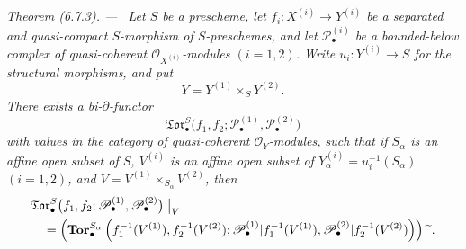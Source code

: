 \documentclass[10pt,oneside]{book}
\newcommand{\sh}[1]{\mathscr{#1}}
\newcommand{\supertilde}{{\,\widetilde{\,}\,}}
\newcommand{\oldpage}[2][]{\setcounter{footnote}{0}\marginpar{\scriptsize\textbf{#1}~|~#2}\ignorespaces}
\newenvironment{theorem}[1][]{\par\medskip\noindent\itshape Theorem (#1). ---\ }{\par}
\begin{document}
\begin{theorem}[6.7.3]
\label{III.6.7.3}
Let $S$ be a prescheme, let
$f_i:X^{(i)}\to Y^{(i)}$ be a separated and quasi-compact
$S$-morphism of $S$-preschemes, and let
$\sh P_\bullet^{(i)}$ be a bounded-below complex of
quasi-coherent $\sh O_{X^{(i)}}$-modules $(i=1,2)$.  Write
$u_i:Y^{(i)}\to S$ for the structural morphisms, and put
\[
  Y=Y^{(1)}\times_SY^{(2)}.
\]
There exists a bi-$\partial$-functor
\[
  \mathfrak{Tor}_\bullet^S
  \bigl(
    f_1,f_2;
    \sh P_\bullet^{(1)},\sh P_\bullet^{(2)}
  \bigr)
\]
with values in the category of quasi-coherent
$\sh O_Y$-modules, such that if $S_\alpha$ is an affine open
subset of $S$, $V^{(i)}$ is an affine open subset of
$Y_\alpha^{(i)}=u_i^{-1}(S_\alpha)$ $(i=1,2)$, and
$V=V^{(1)}\times_{S_\alpha}V^{(2)}$, then
\[
\begin{split}
  &\mathfrak{Tor}_\bullet^S
  \bigl(
    f_1,f_2;
    \sh P_\bullet^{(1)},\sh P_\bullet^{(2)}
  \bigr)\bigm|_V\\
  &\quad=
  \left(
    \mathbf{Tor}_\bullet^{S_\alpha}
    \left(
      f_1^{-1}(V^{(1)}),f_2^{-1}(V^{(2)});
      \sh P_\bullet^{(1)}|f_1^{-1}(V^{(1)}),
      \sh P_\bullet^{(2)}|f_2^{-1}(V^{(2)})
    \right)
  \right)\supertilde .
\end{split}
\]

\oldpage[III]{159}


\end{theorem}
\end{document}
